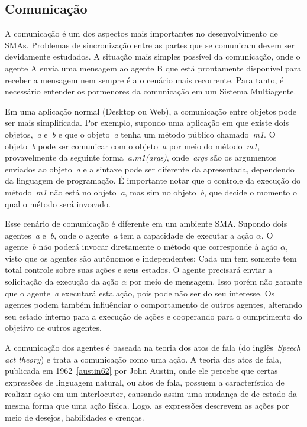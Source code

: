 \subsection{Comunicação}

A comunicação é um dos aspectos mais importantes no desenvolvimento de SMAs. Problemas de sincronização entre as partes que se comunicam devem ser devidamente estudados. A situação mais simples possível da comunicação, onde o agente A envia uma mensagem ao agente B que está prontamente disponível para receber a mensagem nem sempre é a o cenário mais recorrente. Para tanto, é necessário entender os pormenores da comunicação em um Sistema Multiagente.

Em uma aplicação normal (Desktop ou Web), a comunicação entre objetos pode ser mais simplificada. Por exemplo, supondo uma aplicação em que existe dois objetos,~\emph{a} e~\emph{b} e que o objeto~\emph{a} tenha um método público chamado~\emph{m1}. O objeto~\emph{b} pode ser comunicar com o objeto~\emph{a} por meio do método~\emph{m1}, provavelmente da seguinte forma~\emph{a.m1(args)}, onde~\emph{args} são os argumentos enviados ao objeto~\emph{a} e a sintaxe pode ser diferente da apresentada, dependendo da linguagem de programação. É importante notar que o controle da execução do método~\emph{m1} não está no objeto~\emph{a}, mas sim no objeto~\emph{b}, que decide o momento o qual o método será invocado.

Esse cenário de comunicação é diferente em um ambiente SMA. Supondo dois agentes~\emph{a} e~\emph{b}, onde o agente~\emph{a} tem a capacidade de executar a ação $\alpha$. O agente~\emph{b} não poderá invocar diretamente o método que corresponde à ação $\alpha$, visto que os agentes são autônomos e independentes: Cada um tem somente tem total controle sobre suas ações e seus estados. O agente precisará enviar a solicitação da execução da ação $\alpha$ por meio de mensagem. Isso porém não garante que o agente~\emph{a} executará esta ação, pois pode não ser do seu interesse. Os agentes podem também influênciar o comportamento de outros agentes, alterando seu estado interno para a execução de ações e cooperando para o cumprimento do objetivo de outros agentes.

A comunicação dos agentes é baseada na teoria dos atos de fala (do inglês~\emph{Speech act theory}) e trata a comunicação como uma ação. A teoria dos atos de fala, publicada em 1962~\ref{austin62} por John Austin, onde ele percebe que certas expressões de linguagem natural, ou atos de fala, possuem a característica de realizar ação em um interlocutor, causando assim uma mudança de de estado da mesma forma que uma ação física. Logo, as expressões descrevem as ações por meio de desejos, habilidades e crenças.

